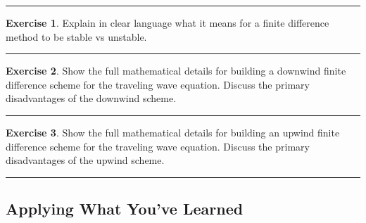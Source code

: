 \documentclass[
]{book}
\theoremstyle{definition}
\theoremstyle{definition}
\theoremstyle{definition}
\newtheorem{exercise}{Exercise}[chapter]
\theoremstyle{remark}
\begin{document}
\begin{center}\rule{0.5\linewidth}{0.5pt}\end{center}

\begin{exercise}
\protect\hypertarget{exr:unnamed-chunk-611}{}{\label{exr:unnamed-chunk-611} }Explain in clear language what it means for a finite difference method to be stable vs unstable.
\end{exercise}

\begin{center}\rule{0.5\linewidth}{0.5pt}\end{center}

\begin{exercise}
\protect\hypertarget{exr:unnamed-chunk-612}{}{\label{exr:unnamed-chunk-612} }Show the full mathematical details for building a downwind finite difference scheme for the traveling wave equation. Discuss the primary disadvantages of the downwind scheme.
\end{exercise}

\begin{center}\rule{0.5\linewidth}{0.5pt}\end{center}

\begin{exercise}
\protect\hypertarget{exr:unnamed-chunk-613}{}{\label{exr:unnamed-chunk-613} }Show the full mathematical details for building an upwind finite difference scheme for the traveling wave equation. Discuss the primary disadvantages of the upwind scheme.
\end{exercise}

\begin{center}\rule{0.5\linewidth}{0.5pt}\end{center}

\hypertarget{applying-what-youve-learned-5}{%
\subsection{Applying What You've Learned}\label{applying-what-youve-learned-5}}
\end{document}
